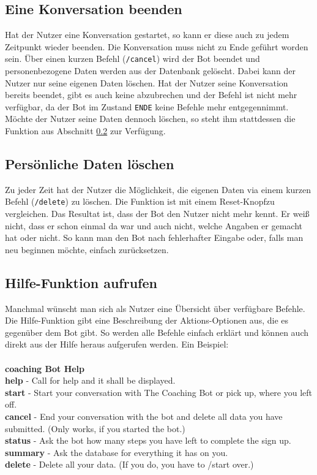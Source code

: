         \subsection{Eine Konversation beenden}
            Hat der Nutzer eine Konversation gestartet, so kann er diese auch zu jedem Zeitpunkt wieder beenden. Die Konversation muss nicht zu Ende geführt worden sein. Über einen kurzen Befehl (\verb|/cancel|) wird der Bot beendet und personenbezogene Daten werden aus der Datenbank gelöscht. Dabei kann der Nutzer nur seine eigenen Daten löschen. Hat der Nutzer seine Konversation bereits beendet, gibt es auch keine abzubrechen und der Befehl ist nicht mehr verfügbar, da der Bot im Zustand \verb|ENDE| keine Befehle mehr entgegennimmt. Möchte der Nutzer seine Daten dennoch löschen, so steht ihm stattdessen die Funktion aus Abschnitt \ref*{Realisierung: delete} zur Verfügung. 
        
        \subsection{Persönliche Daten löschen} \label{Realisierung: delete}
            Zu jeder Zeit hat der Nutzer die Möglichkeit, die eigenen Daten via einem kurzen Befehl (\verb|/delete|) zu löschen. Die Funktion ist mit einem \glqq Reset-Knopf\grqq  zu vergleichen. Das Resultat ist, dass der Bot den Nutzer nicht mehr kennt. Er weiß nicht, dass er schon einmal da war und auch nicht, welche Angaben er gemacht hat oder nicht. So kann man den Bot nach fehlerhafter Eingabe oder, falls man neu beginnen möchte, einfach zurücksetzen.
        
        \subsection{Hilfe-Funktion aufrufen}
            Manchmal wünscht man sich als Nutzer eine Übersicht über verfügbare Befehle. Die Hilfe-Funktion gibt eine Beschreibung der Aktions-Optionen aus, die es gegenüber dem Bot gibt. So werden alle Befehle einfach erklärt und können auch direkt aus der Hilfe heraus aufgerufen werden. Ein Beispiel: \\
            \\
            \textbf{coaching Bot Help}\\
            \textbf{\/help} - Call for help and it shall be displayed.\\
            \textbf{\/start} - Start your conversation with The Coaching Bot or pick up, where you left off.\\
            \textbf{\/cancel} - End your conversation with the bot and delete all data you have submitted. (Only works, if you started the bot.)\\
            \textbf{\/status} - Ask the bot how many steps you have left to complete the sign up.\\
            \textbf{\/summary} - Ask the database for everything it has on you.\\
            \textbf{\/delete} - Delete all your data. (If you do, you have to /start over.)\\

